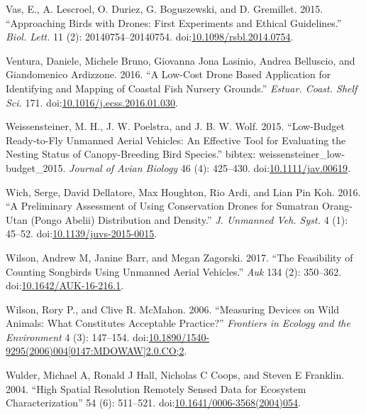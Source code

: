 \documentclass[]{interact}
\theoremstyle{plain}%
\theoremstyle{definition}
\theoremstyle{remark}
\begin{document}
\hypertarget{ref-vas_approaching_2015}{}
Vas, E., A. Lescroel, O. Duriez, G. Boguszewski, and D. Gremillet. 2015.
``Approaching Birds with Drones: First Experiments and Ethical
Guidelines.'' \emph{Biol. Lett.} 11 (2): 20140754--20140754.
doi:\href{https://doi.org/10.1098/rsbl.2014.0754}{10.1098/rsbl.2014.0754}.

\hypertarget{ref-ventura_low-cost_2016}{}
Ventura, Daniele, Michele Bruno, Giovanna Jona Lasinio, Andrea
Belluscio, and Giandomenico Ardizzone. 2016. ``A Low-Cost Drone Based
Application for Identifying and Mapping of Coastal Fish Nursery
Grounds.'' \emph{Estuar. Coast. Shelf Sci.} 171.
doi:\href{https://doi.org/10.1016/j.ecss.2016.01.030}{10.1016/j.ecss.2016.01.030}.

\hypertarget{ref-weissensteiner_low-budget_2015}{}
Weissensteiner, M. H., J. W. Poelstra, and J. B. W. Wolf. 2015.
``Low-Budget Ready-to-Fly Unmanned Aerial Vehicles: An Effective Tool
for Evaluating the Nesting Status of Canopy-Breeding Bird Species.''
bibtex: weissensteiner\_low-budget\_2015. \emph{Journal of Avian
Biology} 46 (4): 425--430.
doi:\href{https://doi.org/10.1111/jav.00619}{10.1111/jav.00619}.

\hypertarget{ref-wich_preliminary_2016}{}
Wich, Serge, David Dellatore, Max Houghton, Rio Ardi, and Lian Pin Koh.
2016. ``A Preliminary Assessment of Using Conservation Drones for
Sumatran Orang-Utan (Pongo Abelii) Distribution and Density.'' \emph{J.
Unmanned Veh. Syst.} 4 (1): 45--52.
doi:\href{https://doi.org/10.1139/juvs-2015-0015}{10.1139/juvs-2015-0015}.

\hypertarget{ref-wilson_feasibility_2017}{}
Wilson, Andrew M, Janine Barr, and Megan Zagorski. 2017. ``The
Feasibility of Counting Songbirds Using Unmanned Aerial Vehicles.''
\emph{Auk} 134 (2): 350--362.
doi:\href{https://doi.org/10.1642/AUK-16-216.1}{10.1642/AUK-16-216.1}.

\hypertarget{ref-wilson_measuring_2006}{}
Wilson, Rory P., and Clive R. McMahon. 2006. ``Measuring Devices on Wild
Animals: What Constitutes Acceptable Practice?'' \emph{Frontiers in
Ecology and the Environment} 4 (3): 147--154.
doi:\href{https://doi.org/10.1890/1540-9295(2006)004\%5B0147:MDOWAW\%5D2.0.CO;2}{10.1890/1540-9295(2006)004{[}0147:MDOWAW{]}2.0.CO;2}.

\hypertarget{ref-wulder_high_2004}{}
Wulder, Michael A, Ronald J Hall, Nicholas C Coops, and Steven E
Franklin. 2004. ``High Spatial Resolution Remotely Sensed Data for
Ecosystem Characterization'' 54 (6): 511--521.
doi:\href{https://doi.org/10.1641/0006-3568(2004)054}{10.1641/0006-3568(2004)054}.
\end{document}
